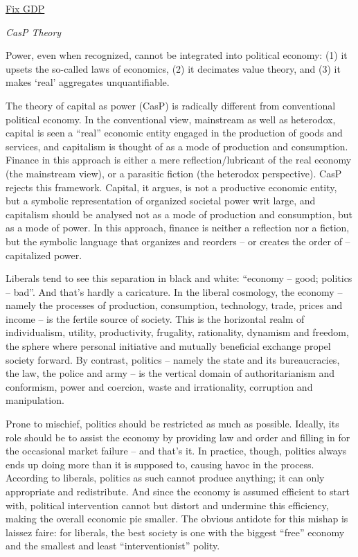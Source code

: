 \documentclass[
]{book}
\begin{document}
\href{https://economicsfromthetopdown.com/2019/12/15/why-we-should-abandon-real-gdp-as-a-measure-of-economic-activity/}{Fix GDP}

\emph{CasP Theory}

Power, even when recognized, cannot be integrated into political economy:
(1) it upsets the so-called laws of economics,
(2) it decimates value theory, and
(3) it makes `real' aggregates unquantifiable.

The theory of capital as power (CasP) is radically different from conventional political
economy.
In the conventional view, mainstream as well as heterodox, capital is seen a ``real'' economic
entity engaged in the production of goods and services, and capitalism is thought of as a
mode of production and consumption. Finance in this approach is either a mere
reflection/lubricant of the real economy (the mainstream view), or a parasitic fiction (the
heterodox perspective).
CasP rejects this framework. Capital, it argues, is not a productive economic entity, but a
symbolic representation of organized societal power writ large, and capitalism should be
analysed not as a mode of production and consumption, but as a mode of power. In this
approach, finance is neither a reflection nor a fiction, but the symbolic language that
organizes and reorders -- or creates the order of -- capitalized power.

Liberals tend to see this separation in black and white: ``economy -- good; politics -- bad''. And
that's hardly a caricature. In the liberal cosmology, the economy -- namely the processes of
production, consumption, technology, trade, prices and income -- is the fertile source of
society. This is the horizontal realm of individualism, utility, productivity, frugality, rationality,
dynamism and freedom, the sphere where personal initiative and mutually beneficial
exchange propel society forward. By contrast, politics -- namely the state and its
bureaucracies, the law, the police and army -- is the vertical domain of authoritarianism and
conformism, power and coercion, waste and irrationality, corruption and manipulation.

Prone to mischief, politics should be restricted as much as possible. Ideally, its role should be
to assist the economy by providing law and order and filling in for the occasional market
failure -- and that's it. In practice, though, politics always ends up doing more than it is
supposed to, causing havoc in the process. According to liberals, politics as such cannot
produce anything; it can only appropriate and redistribute. And since the economy is assumed
efficient to start with, political intervention cannot but distort and undermine this efficiency,
making the overall economic pie smaller. The obvious antidote for this mishap is laissez faire:
for liberals, the best society is one with the biggest ``free'' economy and the smallest and least
``interventionist'' polity.
\end{document}
